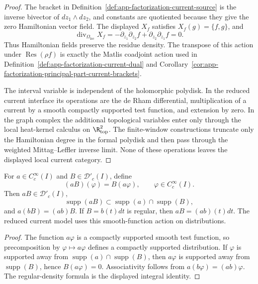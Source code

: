 \begin{proof}
  The bracket in
  Definition~\ref{def:app-factorization-current-source} is the inverse
  bivector of \(dz_1\wedge dz_2\), and constants are quotiented because
  they give the zero Hamiltonian vector field.  The displayed
  \(X_f\) satisfies \(X_f(g)=\{f,g\}\), and
  \[
    \operatorname{div}_{\Omega_{\mathrm{loc}}}X_f
      =-\partial_{z_1}\partial_{z_2}f
        +\partial_{z_2}\partial_{z_1}f=0.
  \]
  Thus Hamiltonian fields preserve the residue density.  The transpose
  of this action under
  \(\operatorname{Res}(\rho f)\) is exactly the Matlis coadjoint action
  used in
  Definition~\ref{def:app-factorization-current-dual} and
  Corollary~\ref{cor:app-factorization-principal-part-current-brackets}.

  The interval variable is independent of the holomorphic polydisk.  In the
  reduced current interface its operations are the de Rham differential,
  multiplication of a current by a smooth compactly supported test
  function, and extension by zero.  In the graph complex the additional
  topological variables enter only through the local heat-kernel
  calculus on \(\R^2_{\mathrm{top}}\).  The finite-window constructions
  truncate only the Hamiltonian degree in the formal polydisk and then pass
  through the weighted Mittag--Leffler inverse limit.  None of these
  operations leaves the displayed local current category.
\end{proof}

\begin{lem}
\label{lem:app-factorization-current-product}
  For \(a\in C^\infty_c(I)\) and \(B\in\mathcal D'_c(I)\), define
  \[
    (aB)(\varphi)=B(a\varphi),
    \qquad \varphi\in C^\infty_c(I).
  \]
  Then \(aB\in\mathcal D'_c(I)\),
  \[
    \operatorname{supp}(aB)\subset
    \operatorname{supp}(a)\cap\operatorname{supp}(B),
  \]
  and \(a(bB)=(ab)B\).  If \(B=b(t)dt\) is regular, then
  \(aB=(ab)(t)dt\).  The reduced current model uses this
  smooth-function action on distributions.
\end{lem}

\begin{proof}
  The function \(a\varphi\) is a compactly supported smooth test
  function, so precomposition by \(\varphi\mapsto a\varphi\) defines a
  compactly supported distribution.  If \(\varphi\) is supported away
  from \(\operatorname{supp}(a)\cap\operatorname{supp}(B)\), then
  \(a\varphi\) is supported away from \(\operatorname{supp}(B)\), hence
  \(B(a\varphi)=0\).  Associativity follows from
  \(a(b\varphi)=(ab)\varphi\).  The regular-density formula is the
  displayed integral identity.
\end{proof}

